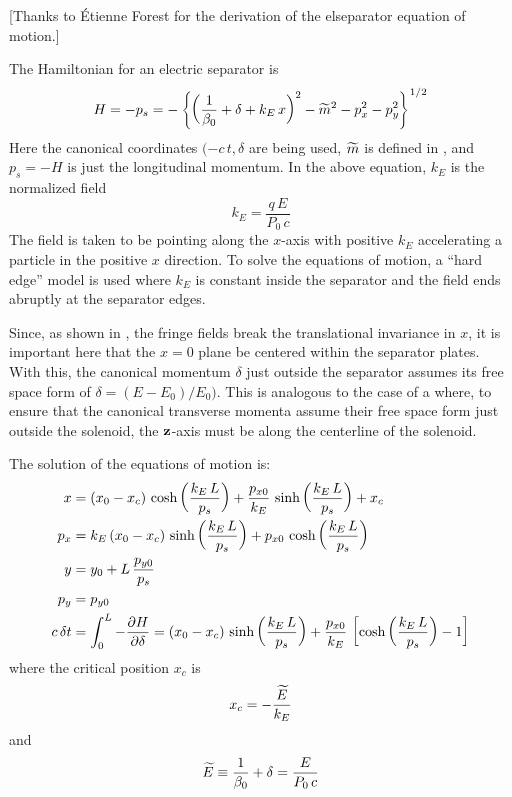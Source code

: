 [Thanks to \'Etienne Forest for the derivation of the elseparator equation of motion.]

The Hamiltonian for an electric separator is 
\begin{equation}
  H = -p_s 
  = - \left\{ \left( \frac{1}{\beta_0} + \delta + k_E \, x \right)^2 - 
  \widetilde m^2 - p_x^2 - p_y^2 \right\}^{1/2}
  \label{hp1b}
\end{equation}
Here the canonical coordinates $(-c \, t, \delta$ are being used,
$\widetilde m$ is defined in , and $p_s = -H$ is just the
longitudinal momentum.  In the above equation, $k_E$ is the normalized
field
\begin{equation}
  k_E = \frac{q \, E}{P_0 \, c}
\end{equation}
The field is taken to be pointing along the $x$-axis with positive
$k_E$ accelerating a particle in the positive $x$ direction. To solve
the equations of motion, a ``hard edge'' model is used where $k_E$ is
constant inside the separator and the field ends abruptly at the
separator edges.

Since, as shown in , the fringe fields break the
translational invariance in $x$, it is important here that the $x = 0$
plane be centered within the separator plates. With this, the
canonical momentum $\delta$ just outside the separator assumes its
free space form of $\delta = (E - E_0) / E_0)$. This is analogous to
the case of a  where, to ensure that the canonical
transverse momenta assume their free space form just outside the
solenoid, the ${\bf z}$-axis must be along the centerline of the
solenoid.

The solution of the equations of motion is:
\begin{align}
  x   &= (x_0 - x_c) \, \cosh \left( \frac{k_E \, L}{p_s} \right) + 
         \frac{p_{x0}}{k_E} \, \sinh \left( \frac{k_E \, L}{p_s} \right) + x_c \nonumber \\
  p_x &= k_E \, (x_0 - x_c) \, \sinh \left( \frac{k_E \, L}{p_s} \right) + 
         {p_{x0}} \, \cosh \left( \frac{k_E \, L}{p_s} \right) \nonumber \\
  y   &= y_0 + L \, \frac{p_{y0}}{p_s} \label{xxlp} \\
  p_y &= p_{y0} \nonumber \\
  c \, \delta t &=  \int_0^L -\frac{\partial H}{\partial \delta}
      = (x_0 - x_c) \, \sinh \left( \frac{k_E \, L}{p_s} \right) +
        \frac{p_{x0}}{k_E} \, \left[ \cosh \left( \frac{k_E \, L}{p_s} \right) - 1 \right]
        \nonumber
\end{align}
where the critical position $x_c$ is
\begin{equation} 
  x_c = -\frac{\widetilde E}{k_E}
\end{equation}
and 
\begin{equation}
  \widetilde E \equiv \frac{1}{\beta_0} + \delta = \frac{E}{P_0 \, c}
\end{equation}
 
